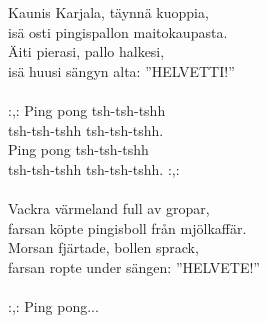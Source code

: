
            Kaunis Karjala, täynnä kuoppia, \\
            isä osti pingispallon maitokaupasta. \\
            Äiti pierasi, pallo halkesi, \\
            isä huusi sängyn alta: ”HELVETTI!” \\
\hspace{10mm} \\
            :,: Ping pong tsh-tsh-tshh \\
            tsh-tsh-tshh tsh-tsh-tshh. \\
            Ping pong tsh-tsh-tshh \\
            tsh-tsh-tshh tsh-tsh-tshh. :,: \\
\hspace{10mm} \\
            Vackra värmeland full av gropar, \\
            farsan köpte pingisboll från mjölkaffär. \\
            Morsan fjärtade, bollen sprack, \\
            farsan ropte under sängen: ”HELVETE!” \\
\hspace{10mm} \\
            :,: Ping pong... \\

